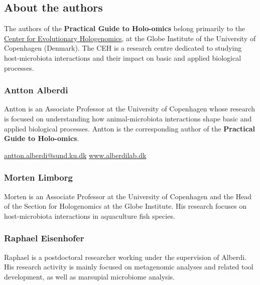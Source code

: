 \documentclass[
]{book}
\begin{document}
\hypertarget{about-the-authors}{%
\subsection*{About the authors}\label{about-the-authors}}

The authors of the \textbf{Practical Guide to Holo-omics} belong primarily to the \href{https://ceh.ku.dk/}{Center for Evolutionary Hologenomics}, at the Globe Institute of the University of Copenhagen (Denmark). The CEH is a research centre dedicated to studying host-microbiota interactions and their impact on basic and applied biological processes.

\hypertarget{antton-alberdi}{%
\subsubsection*{Antton Alberdi}\label{antton-alberdi}}

Antton is an Associate Professor at the University of Copenhagen whose research is focused on understanding how animal-microbiota interactions shape basic and applied biological processes. Antton is the corresponding author of the \textbf{Practical Guide to Holo-omics}.

\url{antton.alberdi@sund.ku.dk} \textbar{} \url{www.alberdilab.dk}

\hypertarget{morten-limborg}{%
\subsubsection*{Morten Limborg}\label{morten-limborg}}

Morten is an Associate Professor at the University of Copenhagen and the Head of the Section for Hologenomics at the Globe Institute. His research focuses on host-microbiota interactions in aquaculture fish species.

\hypertarget{raphael-eisenhofer}{%
\subsubsection*{Raphael Eisenhofer}\label{raphael-eisenhofer}}

Raphael is a postdoctoral researcher working under the supervision of Alberdi. His research activity is mainly focused on metagenomic analyses and related tool development, as well as marsupial microbiome analysis.
\end{document}
